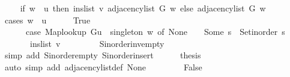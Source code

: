 \begin{isabellebody}
\ \isamarkupfalse%
\ {\isachardoublequoteopen}{\isachardot}{\kern0pt}{\isachardot}{\kern0pt}{\isachardot}{\kern0pt}\ {\isacharequal}{\kern0pt}\ {\isacharparenleft}{\kern0pt}if\ w\ {\isacharequal}{\kern0pt}\ {\isacharquery}{\kern0pt}u\ then\ ins{\isacharunderscore}{\kern0pt}list\ {\isacharquery}{\kern0pt}v\ {\isacharparenleft}{\kern0pt}adjacency{\isacharunderscore}{\kern0pt}list\ G\ w{\isacharparenright}{\kern0pt}\ else\ adjacency{\isacharunderscore}{\kern0pt}list\ G\ w{\isacharparenright}{\kern0pt}{\isachardoublequoteclose}\isanewline
\ \ \isamarkupfalse%
\ {\isacharparenleft}{\kern0pt}cases\ {\isachardoublequoteopen}w\ {\isacharequal}{\kern0pt}\ {\isacharquery}{\kern0pt}u{\isachardoublequoteclose}{\isacharparenright}{\kern0pt}\isanewline
\ \ \ \ \isamarkupfalse%
\ True\isanewline
\ \ \ \ \isamarkupfalse%
\isanewline
\ \ \ \ \ \ {\isachardoublequoteopen}{\isacharparenleft}{\kern0pt}case\ {\isacharparenleft}{\kern0pt}Map{\isacharunderscore}{\kern0pt}lookup\ G{\isacharparenleft}{\kern0pt}{\isacharquery}{\kern0pt}u\ {\isasymmapsto}\ {\isacharquery}{\kern0pt}singleton{\isacharparenright}{\kern0pt}{\isacharparenright}{\kern0pt}\ w\ of\ None\ {\isasymRightarrow}\ {\isacharbrackleft}{\kern0pt}{\isacharbrackright}{\kern0pt}\ {\isacharbar}{\kern0pt}\ Some\ s\ {\isasymRightarrow}\ Set{\isacharunderscore}{\kern0pt}inorder\ s{\isacharparenright}{\kern0pt}\ {\isacharequal}{\kern0pt}\isanewline
\ \ \ \ \ \ \ ins{\isacharunderscore}{\kern0pt}list\ {\isacharquery}{\kern0pt}v\ {\isacharbrackleft}{\kern0pt}{\isacharbrackright}{\kern0pt}{\isachardoublequoteclose}\isanewline
\ \ \ \ \ \ \isamarkupfalse%
\ S{\isachardot}{\kern0pt}inorder{\isacharunderscore}{\kern0pt}inv{\isacharunderscore}{\kern0pt}empty\isanewline
\ \ \ \ \ \ \isamarkupfalse%
\ {\isacharparenleft}{\kern0pt}simp\ add{\isacharcolon}{\kern0pt}\ S{\isachardot}{\kern0pt}inorder{\isacharunderscore}{\kern0pt}empty\ S{\isachardot}{\kern0pt}inorder{\isacharunderscore}{\kern0pt}insert{\isacharparenright}{\kern0pt}\isanewline
\ \ \ \ \isamarkupfalse%
\ {\isacharquery}{\kern0pt}thesis\isanewline
\ \ \ \ \ \ \isamarkupfalse%
\ {\isacharparenleft}{\kern0pt}auto\ simp\ add{\isacharcolon}{\kern0pt}\ adjacency{\isacharunderscore}{\kern0pt}list{\isacharunderscore}{\kern0pt}def\ None{\isacharparenright}{\kern0pt}\isanewline
\ \ \isamarkupfalse%
\isanewline
\ \ \ \ \isamarkupfalse%
\ False\isanewline
\ \ \ \ \isamarkupfalse%
\ \isamarkupfalse%

\end{isabellebody}
